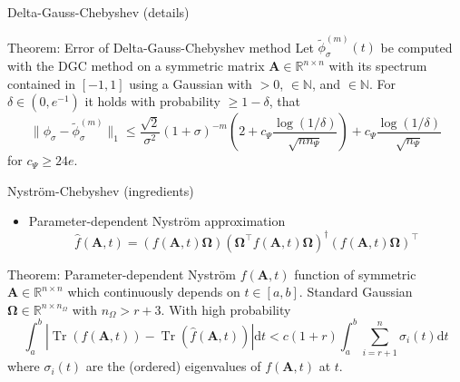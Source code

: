 \documentclass[aspectratio=169, leqno, 12pt]{beamer}
\newcommand{\mtx}[1]{\boldsymbol{#1}}
\DeclareMathOperator{\Tr}{Tr}
\begin{document}
\begin{frame}{Delta-Gauss-Chebyshev (details)}
    \begin{block}{Theorem: Error of Delta-Gauss-Chebyshev method}
        Let $\widetilde{\phi}_{\sigma}^{(m)}(t)$ be computed with the \gls{DGC} method
        on a symmetric matrix $\mtx{A} \in \mathbb{R}^{n \times n}$ with its spectrum contained in $[-1, 1]$ using
        a Gaussian  with
         $>0$,  $\in \mathbb{N}$, and
         $\in \mathbb{N}$. For $\delta \in (0, e^{-1})$ it holds with
        probability $\geq 1-\delta$, that
        \begin{equation}
            \lVert \phi_{\sigma} - \widetilde{\phi}_{\sigma}^{(m)}\rVert _1
            \leq \frac{\sqrt{2}}{\sigma^2} (1 + \sigma)^{-m} \left( 2 + c_{\Psi} \frac{\log(1/\delta)}{\sqrt{n n_{\Psi}}} \right) + c_{\Psi} \frac{\log(1/\delta)}{\sqrt{n_{\Psi}}}
        \end{equation}
        for $c_{\Psi} \geq 24e$.
    \end{block}
\end{frame}

\begin{frame}{Nystr\"om-Chebyshev (ingredients)}
    \begin{itemize}
        \item Parameter-dependent Nystr\"om approximation
        \begin{equation}
            \widehat{f}(\mtx{A}, t) = (f(\mtx{A}, t) \mtx{\Omega}) (\mtx{\Omega}^{\top} f(\mtx{A}, t) \mtx{\Omega})^{\dagger} (f(\mtx{A}, t) \mtx{\Omega})^{\top}
        \end{equation}
    \end{itemize}
    \begin{block}{Theorem: Parameter-dependent Nystr\"om \cite{he2023parameter}}
        $f(\mtx{A}, t)$ function of symmetric $\mtx{A} \in \mathbb{R}^{n \times n}$ which
        continuously depends on $t \in [a,b]$. 
        Standard Gaussian $\mtx{\Omega} \in \mathbb{R}^{n \times n_{\Omega}}$
        with $n_{\Omega} > r + 3$. With high probability
        \begin{equation}
            \int_{a}^{b} | \Tr(f(\mtx{A}, t)) - \Tr(\widehat{f}(\mtx{A}, t))| \mathrm{d}t
                < c (1 + r) \int_{a}^{b} \sum_{i = r+1}^n \sigma_i(t) \mathrm{d}t
        \end{equation}
        where $\sigma_i(t)$ are the (ordered) eigenvalues of $f(\mtx{A}, t)$ at $t$.
    \end{block}
\end{frame}
\end{document}
